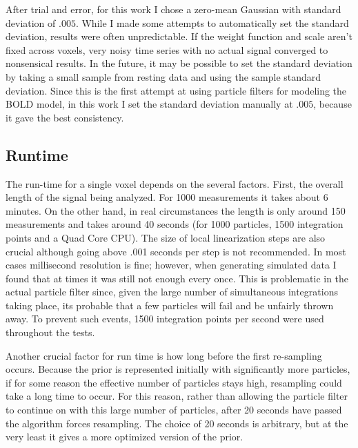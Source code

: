 After trial and error, for this work I chose a zero-mean Gaussian with standard deviation 
of $.005$. While I made some attempts to automatically set the standard 
deviation, results were often unpredictable. If the weight function and scale aren't
fixed across voxels, very noisy time series with no actual signal 
converged to nonsensical results. 
In the future, it may be possible to set the standard deviation by
taking a small sample from resting data and using the sample standard deviation.
Since this is the first attempt at using particle filters for modeling the 
BOLD model, in this work I set the standard deviation manually at $.005$,
because it gave the best consistency. 

\subsection{Runtime}
The run-time for a single voxel depends on the several factors. First, the
overall length of the signal being analyzed. For 1000 measurements it takes
about 6 minutes. On the other hand, in real circumstances the
length is only around 150 measurements and takes around 40 seconds (for 1000 
particles, 1500 integration points and a Quad Core CPU). The size of 
local linearization steps are also crucial although going above .001 seconds
per step is not recommended. In most cases millisecond resolution
is fine; however, when generating simulated data I found that at times it was
still not enough every once. This is problematic in the actual particle
filter since, given the large number of simultaneous integrations taking 
place, its probable that a few particles will fail and be unfairly thrown away.
To prevent such events, 1500 integration points per second were used throughout
the tests. 

Another crucial factor for run time is how long before the first re-sampling 
occurs. Because the prior is represented initially with significantly more
particles, if for some reason the effective
number of particles stays high, resampling could take a long time to occur.
For this reason, rather than allowing the particle filter to continue on 
with this large number of particles, after 20 seconds have passed the
algorithm forces resampling. The choice of 20 seconds is 
arbitrary, but at the very least it gives a more optimized version of the
prior. 

